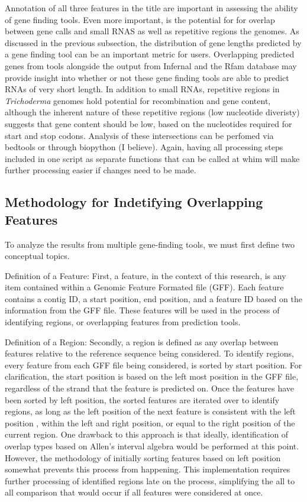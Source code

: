 Annotation of all three features in the title are important in
assessing the ability of gene finding tools. Even more important, is
the potential for for overlap between gene calls and small RNAS as
well as repetitive regions the genomes. As discussed in the previous
subsection, the distribution of gene lengths predicted by a gene
finding tool can be an important metric for users. Overlapping
predicted genes from tools alongside the output from Infernal and the
Rfam database may provide insight into whether or not these gene
finding tools are able to predict RNAs of very short length. In
addition to small RNAs, repetitive regions in \textit{Trichoderma}
genomes hold potential for recombination and gene content, although
the inherent nature of these repetitive regions (low nucleotide
diveristy) suggests that gene content should be low, based on the
nucleotides required for start and stop codons. Analysis of these
intersections can be perfomed via bedtools or through biopython (I
believe). Again, having all processing steps included in one script as
separate functions that can be called at whim will make further
processing easier if changes need to be made.

\subsection{Methodology for Indetifying Overlapping Features}

To analyze the results from multiple gene-finding tools, we must first
define two conceptual topics.

Definition of a Feature: First, a feature, in the context of this
research, is any item contained within a Genomic Feature Formated file
(GFF). Each feature contains a contig ID, a start position, end
position, and a feature ID based on the information from the GFF
file. These features will be used in the process of identifying
regions, or overlapping features from prediction tools.

Definition of a Region: Secondly, a region is defined as any overlap
between features relative to the reference sequence being
considered. To identify regions, every feature from each GFF file
being considered, is sorted by start position. For clarification, the
start position is based on the left most position in the GFF file,
regardless of the strand that the feature is predicted on. Once the
features have been sorted by left position, the sorted features are
iterated over to identify regions, as long as the left position of the
next feature is consistent with the left position , within the left
and right position, or equal to the right position of the current
region. One drawback to this approach is that ideally, identification
of overlap types based on Allen's interval algebra would be performed
at this point. However, the methodology of initially sorting features
based on left position somewhat prevents this process from
happening. This implementation requires further processing of
identified regions late on the process, simplifying the all to all
comparison that would occur if all features were considered at once.

